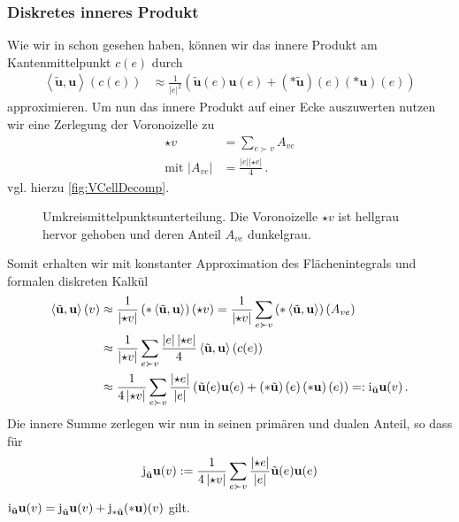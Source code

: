 \documentclass[a4paper,11pt]{scrartcl}
\newcommand{\U}{u} %
\newcommand{\Ub}{\mathbf{\U}} %
\newcommand{\jup}{\textup{j}} %
\newcommand{\formPeriod}{\,\text{.}}
\begin{document}
  \subsubsection{Diskretes inneres Produkt}
    Wie wir in \cite{Nestler2016} schon gesehen haben, können wir das innere Produkt am Kantenmittelpunkt \( c(e) \) durch
    \begin{align}
      \left\langle \tilde{\Ub} , \Ub \right\rangle(c(e))
          &\approx \frac{1}{\left| e \right|^{2}}\left( \tilde{\Ub}(e) \Ub(e) + \left( *\tilde{\Ub} \right)(e) \left( *\Ub \right)(e) \right)
    \end{align}
    approximieren.
    Um nun das innere Produkt auf einer Ecke auszuwerten nutzen wir eine Zerlegung der Voronoizelle zu
    \begin{align}
      \star v &= \sum_{e\succ v} A_{ve} \\
      \text{mit } \left|A_{ve}\right| &= \frac{\left| e \right|\left| \star e \right|}{4} \formPeriod
    \end{align}
    vgl. hierzu \autoref{fig:VCellDecomp}.
    \begin{figure}[tbp]
      \centering
      
      \caption{Umkreismittelpunktsunterteilung. Die Voronoizelle \( \star v \) ist hellgrau hervor gehoben und deren Anteil \( A_{ve} \) dunkelgrau.}
      \label{fig:VCellDecomp}
    \end{figure}
    Somit erhalten wir mit konstanter Approximation des Flächenintegrals und formalen diskreten Kalkül
    \begin{align}
      \left\langle \tilde{\Ub} , \Ub \right\rangle(v)
          &\approx \frac{1}{\left| \star v \right|}\left( *\left\langle \tilde{\Ub} , \Ub \right\rangle  \right)(\star v) 
           = \frac{1}{\left| \star v \right|}\sum_{e\succ v}\left( *\left\langle \tilde{\Ub} , \Ub \right\rangle  \right)(A_{ve}) \\
          &\approx\frac{1}{\left| \star v \right|}\sum_{e\succ v} \frac{\left| e \right|\left| \star e \right|}{4}  \left\langle \tilde{\Ub} , \Ub \right\rangle(c(e)) \\
          &\approx\frac{1}{4\left| \star v \right|}\sum_{e\succ v} \frac{\left| \star e \right|}{\left| e \right|} \left( \tilde{\Ub}(e) \Ub(e) + \left( *\tilde{\Ub} \right)(e) \left( *\Ub \right)(e) \right)
           =: \textup{i}_{\tilde{\Ub}}\Ub(v)\formPeriod
    \end{align}
    Die innere Summe zerlegen wir nun in seinen primären und dualen Anteil, so dass für
    \begin{align}
      \jup_{\tilde{\Ub}}\Ub(v) := \frac{1}{4\left| \star v \right|}\sum_{e\succ v} \frac{\left| \star e \right|}{\left| e \right|} \tilde{\Ub}(e) \Ub(e)
    \end{align}
    \( \textup{i}_{\tilde{\Ub}}\Ub(v) =  \jup_{\tilde{\Ub}}\Ub(v) + \jup_{*\tilde{\Ub}}(*\Ub)(v)\) gilt.
\end{document}
